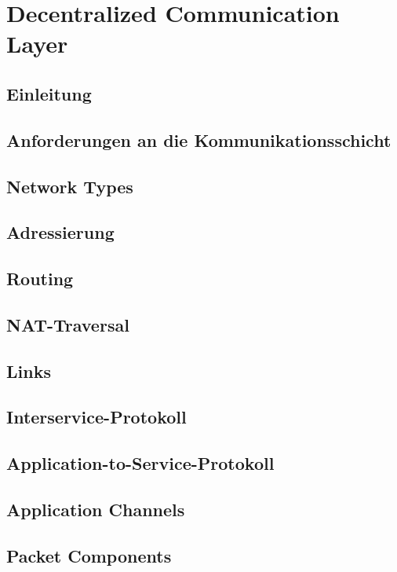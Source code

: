\chapter{Decentralized Communication Layer}\label{DCL}
\renewcommand{\kapitelautor}{Autor: Martin Exner}

\section{Einleitung}


\section{Anforderungen an die Kommunikationsschicht}


\section{Network Types}


\section{Adressierung}


\section{Routing}


\section{NAT-Traversal}


\section{Links}


\section{Interservice-Protokoll}


\section{Application-to-Service-Protokoll}


\section{Application Channels}


\section{Packet Components}

